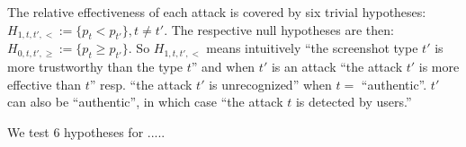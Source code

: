 The relative effectiveness of each attack is covered by six trivial hypotheses: $H_{1,t,t',<} := \{p_{t} < p_{t'}\}, t\neq t'$. The respective null hypotheses are then: $H_{0,t,t',\ge} := \{p_{t}\ge p_{t'}\}$. So $H_{1,t,t',<}$ means intuitively ``the screenshot type $t'$ is more trustworthy than the type $t$'' and when $t'$ is an attack ``the attack $t'$ is more effective than $t$'' resp. ``the attack $t'$ is unrecognized'' when $t = $ ``authentic''. $t'$ can also be ``authentic'', in which case ``the attack $t$ is detected by users.''

We test 6 hypotheses for .....
